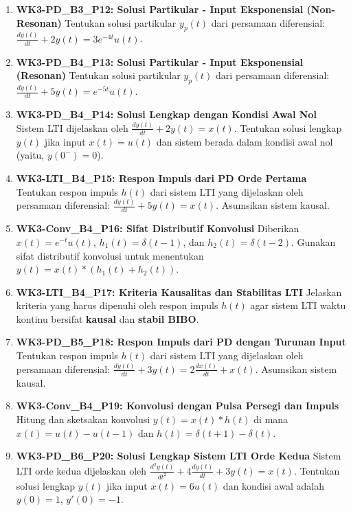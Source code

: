 \documentclass[
  letterpaper,
  DIV=11,
  numbers=noendperiod]{scrreprt}
\begin{document}
\begin{enumerate}
\item
  \textbf{WK3-PD\_B3\_P12: Solusi Partikular - Input Eksponensial
  (Non-Resonan)} Tentukan solusi partikular \(y_p(t)\) dari persamaan
  diferensial: \(\frac{dy(t)}{dt} + 2y(t) = 3e^{-4t}u(t)\).
\item
  \textbf{WK3-PD\_B4\_P13: Solusi Partikular - Input Eksponensial
  (Resonan)} Tentukan solusi partikular \(y_p(t)\) dari persamaan
  diferensial: \(\frac{dy(t)}{dt} + 5y(t) = e^{-5t}u(t)\).
\item
  \textbf{WK3-PD\_B4\_P14: Solusi Lengkap dengan Kondisi Awal Nol}
  Sistem LTI dijelaskan oleh \(\frac{dy(t)}{dt} + 2y(t) = x(t)\).
  Tentukan solusi lengkap \(y(t)\) jika input \(x(t) = u(t)\) dan sistem
  berada dalam kondisi awal nol (yaitu, \(y(0^-)=0\)).
\item
  \textbf{WK3-LTI\_B4\_P15: Respon Impuls dari PD Orde Pertama} Tentukan
  respon impuls \(h(t)\) dari sistem LTI yang dijelaskan oleh persamaan
  diferensial: \(\frac{dy(t)}{dt} + 5y(t) = x(t)\). Asumsikan sistem
  kausal.
\item
  \textbf{WK3-Conv\_B4\_P16: Sifat Distributif Konvolusi} Diberikan
  \(x(t) = e^{-t}u(t)\), \(h_1(t) = \delta(t-1)\), dan
  \(h_2(t) = \delta(t-2)\). Gunakan sifat distributif konvolusi untuk
  menentukan \(y(t) = x(t) * (h_1(t) + h_2(t))\).
\item
  \textbf{WK3-LTI\_B4\_P17: Kriteria Kausalitas dan Stabilitas LTI}
  Jelaskan kriteria yang harus dipenuhi oleh respon impuls \(h(t)\) agar
  sistem LTI waktu kontinu bersifat \textbf{kausal} dan \textbf{stabil
  BIBO}.
\item
  \textbf{WK3-PD\_B5\_P18: Respon Impuls dari PD dengan Turunan Input}
  Tentukan respon impuls \(h(t)\) dari sistem LTI yang dijelaskan oleh
  persamaan diferensial:
  \(\frac{d y(t)}{dt} + 3 y(t) = 2 \frac{d x(t)}{dt} + x(t)\). Asumsikan
  sistem kausal.
\item
  \textbf{WK3-Conv\_B4\_P19: Konvolusi dengan Pulsa Persegi dan Impuls}
  Hitung dan sketsakan konvolusi \(y(t) = x(t) * h(t)\) di mana
  \(x(t) = u(t) - u(t-1)\) dan \(h(t) = \delta(t+1) - \delta(t)\).
\item
  \textbf{WK3-PD\_B6\_P20: Solusi Lengkap Sistem LTI Orde Kedua} Sistem
  LTI orde kedua dijelaskan oleh
  \(\frac{d^2 y(t)}{dt^2} + 4 \frac{dy(t)}{dt} + 3 y(t) = x(t)\).
  Tentukan solusi lengkap \(y(t)\) jika input \(x(t) = 6u(t)\) dan
  kondisi awal adalah \(y(0) = 1\), \(y'(0) = -1\).
\end{enumerate}

\end{document}

